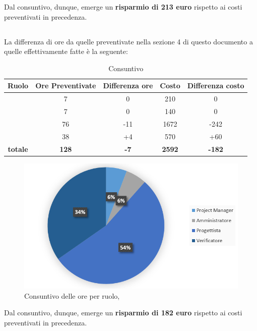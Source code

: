 Dal consuntivo, dunque, emerge un \textbf{risparmio di 213 euro} rispetto ai costi preventivati in precedenza.

\newpage

\subsection{\PD}
La differenza di ore da quelle preventivate nella sezione 4 di questo documento a quelle effettivamente fatte è la seguente:


\begin{table}[h]
	\begin{center}
		\begin{tabular}{|c|c|c|c|c|}
			\hline
			\textbf{Ruolo}	& \textbf{Ore Preventivate} & \textbf{Differenza ore} & \textbf{Costo} & \textbf{Differenza costo}\\
			\hline
			\Pm &	7  & 0 &	210 &	0\\
			\hline
			\Am	&	7 &	0 & 140 & 0\\
			\hline
			\Prog	&	76 & -11 & 1672 & -242 \\
			\hline
			\Ver &	38 & +4 & 570 & +60\\
			\hline
			\textbf{totale}	&	\textbf{128} & \textbf{-7} & \textbf{2592} & \textbf{-182} \\
			\hline
		\end{tabular}
	\end{center}
	\caption{Consuntivo \PD}
\end{table}

\begin{figure}[H]
	\centering 
	\includegraphics[scale=1.25]{Immagini/Consuntivo/ConsuntivoPD.png}
	\caption{Consuntivo delle ore per ruolo, \PD}
\end{figure}

Dal consuntivo, dunque, emerge un \textbf{risparmio di 182 euro} rispetto ai costi preventivati in precedenza.
